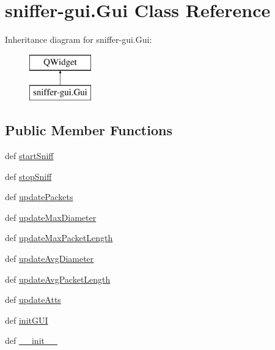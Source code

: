 \hypertarget{classsniffer-gui_1_1Gui}{\section{sniffer-\/gui.Gui Class Reference}
\label{classsniffer-gui_1_1Gui}
}
Inheritance diagram for sniffer-\/gui.Gui\-:\begin{figure}[H]
\begin{center}
\leavevmode
\includegraphics[height=2.000000cm]{classsniffer-gui_1_1Gui}
\end{center}
\end{figure}
\subsection*{Public Member Functions}
\begin{DoxyCompactItemize}
\item 
def \hyperlink{classsniffer-gui_1_1Gui_a2c7490c4f10068fa19515cc5c43c88a4}{start\-Sniff}
\item 
def \hyperlink{classsniffer-gui_1_1Gui_a70d3968b06a700a4736504858fb6b07c}{stop\-Sniff}
\item 
def \hyperlink{classsniffer-gui_1_1Gui_a5d3cfac3eb315e660ac2020ba8d1acea}{update\-Packets}
\item 
def \hyperlink{classsniffer-gui_1_1Gui_ad14ede47ebc1a2ff80840f2666c23e5b}{update\-Max\-Diameter}
\item 
def \hyperlink{classsniffer-gui_1_1Gui_a644cf3bc5282688d0c5cca10e180ef1a}{update\-Max\-Packet\-Length}
\item 
def \hyperlink{classsniffer-gui_1_1Gui_a48406519cf9ac933f9fe41f8f6bbcb5b}{update\-Avg\-Diameter}
\item 
def \hyperlink{classsniffer-gui_1_1Gui_a145c353f3891a41451d16055714a0bed}{update\-Avg\-Packet\-Length}
\item 
def \hyperlink{classsniffer-gui_1_1Gui_ab304fbf63f42d37ac20bdd8463e5135f}{update\-Atts}
\item 
def \hyperlink{classsniffer-gui_1_1Gui_a6b8d94881aa398b0debaefd4829b1375}{init\-G\-U\-I}
\item 
def \hyperlink{classsniffer-gui_1_1Gui_ae96f28df9f3fcd6a2174b7c6c4b3d409}{\-\_\-\-\_\-init\-\_\-\-\_\-}
\end{DoxyCompactItemize}
